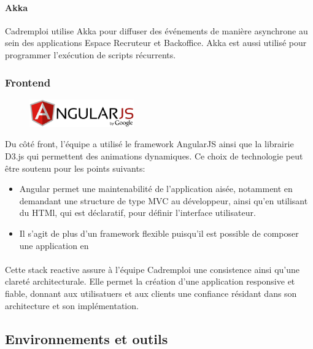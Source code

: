 \paragraph{Akka}
Cadremploi utilise Akka pour diffuser des événements de manière asynchrone au sein des applications Espace Recruteur et Backoffice.
Akka est aussi utilisé pour programmer l'exécution de scripts récurrents.

\subsubsection{Frontend}
\label{subs:Frontend}
\begin{figure}[h]
  \begin{center}
    \includegraphics[width=0.4\textwidth]{Pictures/angular_logo.png}
  \end{center}
\end{figure}
Du côté front, l'équipe a utilisé le framework AngularJS ainsi que la librairie D3.js qui permettent des animations dynamiques.
Ce choix de technologie peut être soutenu pour les points suivants:
\begin{itemize}
  \item Angular permet une maintenabilité de l'application aisée, notamment en demandant une structure de type MVC au développeur, ainsi qu'en utilisant du HTMl, qui est déclaratif, pour définir l'interface utilisateur.
  \item Il s'agit de plus d'un framework flexible puisqu'il est possible de composer une application en
\end{itemize}


\paragraph{}
Cette stack reactive assure à l'équipe Cadremploi une consistence ainsi qu'une clareté architecturale.
Elle permet la création d'une application responsive et fiable, donnant aux utilisatuers et aux clients une confiance résidant dans son architecture et son implémentation.

\subsection{Environnements et outils}
